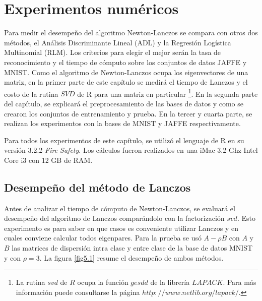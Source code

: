 \chapter{Experimentos numéricos}
\label{ch:chapter4}

Para medir el desempeño del algoritmo Newton-Lanczos se compara con otros dos métodos, el Análisis Discriminante Lineal (ADL) y la Regresión Logística Multinomial (RLM). Los criterios para elegir el mejor serán la tasa de reconocimiento y el tiempo de cómputo sobre los conjuntos de datos JAFFE y MNIST. Como el algoritmo de Newton-Lanczos ocupa los eigenvectores de una matriz, en la primer parte de este capítulo se medirá el tiempo de Lanczos y el costo de la rutina $SVD$ de R para una matriz en particular \footnote{La rutina $svd$ de $R$ ocupa la función $gesdd$ de la librería $LAPACK$. Para más información puede consultarse la página $http://www.netlib.org/lapack/$.}. En la segunda parte del capítulo, se explicará el preprocesamiento de las bases de datos y como se crearon los conjuntos de entrenamiento y prueba. En la tercer y cuarta parte, se realizan los experimentos con la bases de MNIST y JAFFE respectivamente. 

Para todos los experimentos de este capítulo, se utilizó el lenguaje de \textsf{R} en su versión 3.2.2 \textit{Fire Safety}. Los cálculos fueron realizados en una iMac 3.2 Ghz Intel Core i3 con 12 GB de RAM.

\section{Desempeño del método de Lanczos}

Antes de analizar el tiempo de cómputo de Newton-Lanczos, se evaluará el desempeño del algoritmo de Lanczos comparándolo con la factorización $svd$. Esto experimento es para saber en que casos es conveniente utilizar Lanczos y en cuales conviene calcular todos eigenpares. Para la prueba se usó $A - \rho B$ con $A$ y $B$ las matrices de dispersión intra clase y entre clase de la base de datos MNIST y con $\rho = 3$. La figura \ref{fig5.1} resume el desempeño de ambos métodos.

